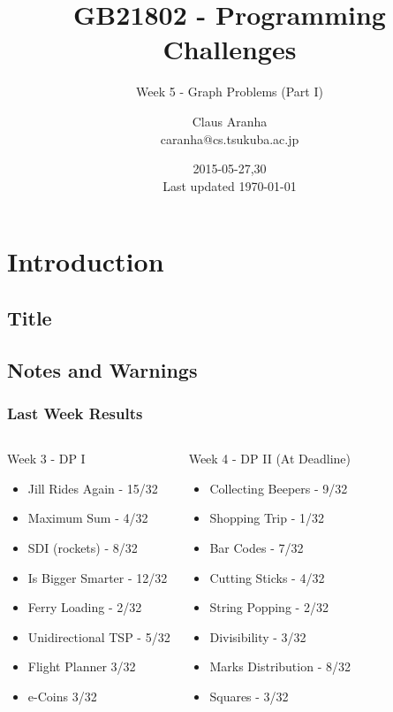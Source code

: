 \documentclass{beamer}
\title[GB21802]{GB21802 - Programming Challenges}
\subtitle[]{Week 5 - Graph Problems (Part I)}
\author[Claus Aranha]{Claus Aranha\\{\footnotesize caranha@cs.tsukuba.ac.jp}}
\institute{College of Information Science}
\date{2015-05-27,30\\{\tiny Last updated \today}}
\begin{document}
\section{Introduction}
\subsection{Title}
\begin{frame}
\maketitle
\end{frame}

\subsection{Notes and Warnings}

\begin{frame}
  \frametitle{Last Week Results}
  \begin{columns}[T]
    \begin{block}{Week 3 - DP I}
      \begin{itemize}
      \item Jill Rides Again - 15/32
      \item Maximum Sum - 4/32
      \item SDI (rockets) - 8/32
      \item Is Bigger Smarter - 12/32
      \item Ferry Loading - 2/32
      \item Unidirectional TSP - 5/32
      \item Flight Planner 3/32
      \item e-Coins 3/32
      \end{itemize}
    \end{block}
    \begin{block}{Week 4 - DP II (At Deadline)} 
      \begin{itemize}
      \item Collecting Beepers - 9/32
      \item Shopping Trip - 1/32
      \item Bar Codes - 7/32
      \item Cutting Sticks - 4/32
      \item String Popping - 2/32
      \item Divisibility - 3/32
      \item Marks Distribution - 8/32
      \item Squares - 3/32
      \end{itemize}
    \end{block}
  \end{columns}
\end{frame}
\end{document}

